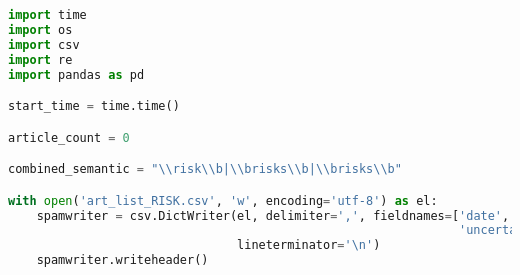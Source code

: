 \documentclass[12pt]{article}
\begin{document}
\begin{lstlisting}[language=Python]
import time
import os
import csv
import re
import pandas as pd

start_time = time.time()

article_count = 0

combined_semantic = "\\risk\\b|\\brisks\\b|\\brisks\\b"

with open('art_list_RISK.csv', 'w', encoding='utf-8') as el:
    spamwriter = csv.DictWriter(el, delimiter=',', fieldnames=['date', 'url', 'alt_url', 'tags', 'filename',
                                                               'uncertainty'],
                                lineterminator='\n')
    spamwriter.writeheader()


\end{lstlisting}
\end{document}
